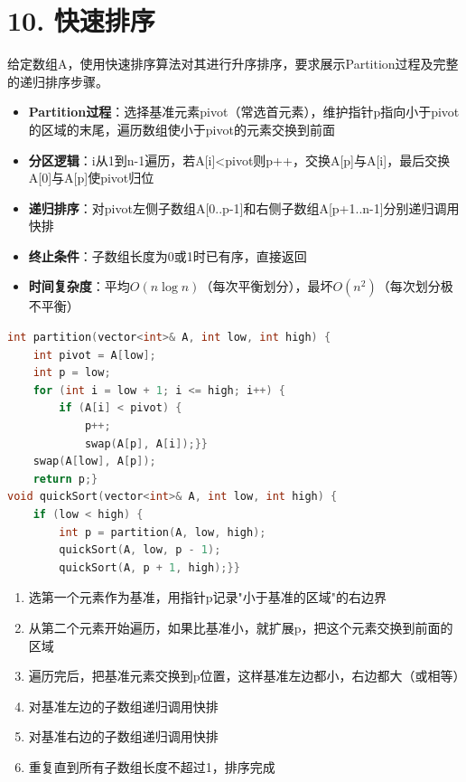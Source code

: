 \section*{10. 快速排序}
给定数组A，使用快速排序算法对其进行升序排序，要求展示Partition过程及完整的递归排序步骤。
\begin{itemize}
    \item \textbf{Partition过程}：选择基准元素pivot（常选首元素），维护指针p指向小于pivot的区域的末尾，遍历数组使小于pivot的元素交换到前面
    \item \textbf{分区逻辑}：i从1到n-1遍历，若A[i]<pivot则p++，交换A[p]与A[i]，最后交换A[0]与A[p]使pivot归位
    \item \textbf{递归排序}：对pivot左侧子数组A[0..p-1]和右侧子数组A[p+1..n-1]分别递归调用快排
    \item \textbf{终止条件}：子数组长度为0或1时已有序，直接返回
    \item \textbf{时间复杂度}：平均$O(n\log n)$（每次平衡划分），最坏$O(n^2)$（每次划分极不平衡）
\end{itemize}
\begin{lstlisting}[language=C++, style=cppstyle]
int partition(vector<int>& A, int low, int high) {
    int pivot = A[low];
    int p = low;
    for (int i = low + 1; i <= high; i++) {
        if (A[i] < pivot) {
            p++;
            swap(A[p], A[i]);}}
    swap(A[low], A[p]);
    return p;}
void quickSort(vector<int>& A, int low, int high) {
    if (low < high) {
        int p = partition(A, low, high);
        quickSort(A, low, p - 1);
        quickSort(A, p + 1, high);}}
\end{lstlisting}
\begin{enumerate}
    \item 选第一个元素作为基准，用指针p记录"小于基准的区域"的右边界
    \item 从第二个元素开始遍历，如果比基准小，就扩展p，把这个元素交换到前面的区域
    \item 遍历完后，把基准元素交换到p位置，这样基准左边都小，右边都大（或相等）
    \item 对基准左边的子数组递归调用快排
    \item 对基准右边的子数组递归调用快排
    \item 重复直到所有子数组长度不超过1，排序完成
\end{enumerate}
